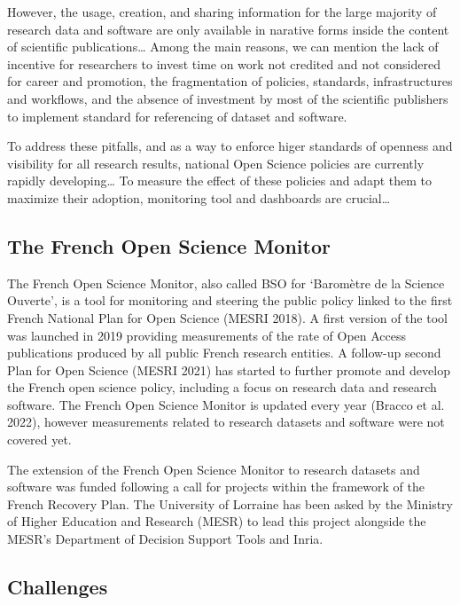 \documentclass[
]{article}
\begin{document}
However, the usage, creation, and sharing information for the large
majority of research data and software are only available in narative
forms inside the content of scientific publications\ldots{} Among the
main reasons, we can mention the lack of incentive for researchers to
invest time on work not credited and not considered for career and
promotion, the fragmentation of policies, standards, infrastructures and
workflows, and the absence of investment by most of the scientific
publishers to implement standard for referencing of dataset and
software.

To address these pitfalls, and as a way to enforce higer standards of
openness and visibility for all research results, national Open Science
policies are currently rapidly developing\ldots{} To measure the effect
of these policies and adapt them to maximize their adoption, monitoring
tool and dashboards are crucial\ldots{}

\hypertarget{the-french-open-science-monitor}{%
\subsection{The French Open Science
Monitor}\label{the-french-open-science-monitor}}

The French Open Science Monitor, also called BSO for `Baromètre de la
Science Ouverte', is a tool for monitoring and steering the public
policy linked to the first French National Plan for Open Science (MESRI
2018). A first version of the tool was launched in 2019 providing
measurements of the rate of Open Access publications produced by all
public French research entities. A follow-up second Plan for Open
Science (MESRI 2021) has started to further promote and develop the
French open science policy, including a focus on research data and
research software. The French Open Science Monitor is updated every year
(Bracco et al. 2022), however measurements related to research datasets
and software were not covered yet.

The extension of the French Open Science Monitor to research datasets
and software was funded following a call for projects within the
framework of the French Recovery Plan. The University of Lorraine has
been asked by the Ministry of Higher Education and Research (MESR) to
lead this project alongside the MESR's Department of Decision Support
Tools and Inria.

\hypertarget{challenges}{%
\subsection{Challenges}\label{challenges}}
\end{document}
